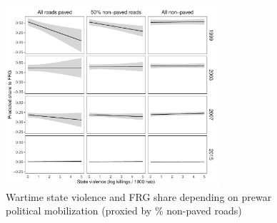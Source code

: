 \documentclass[a4paper, 12pt, notitlepage]{article}
\begin{document}
\begin{figure}[htb!]
  \centering
    \includegraphics[width = 0.7\textwidth]{img/pp_FRG_roads_year}

  \caption{Wartime state violence and FRG share depending on prewar political mobilization (proxied by \% non-paved roads)} \label{fig:pp_FRG_roads_yrs}

\end{figure}
\end{document}
